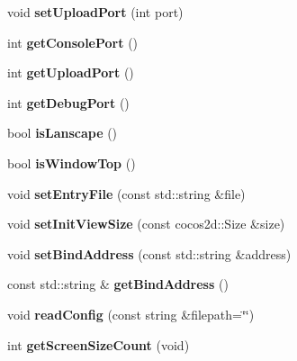 \begin{DoxyCompactItemize}
void {\bfseries set\+Upload\+Port} (int port)
\item 
\mbox{\label{classConfigParser_adcb7fe3088251c51044e757d50c95291}} 
int {\bfseries get\+Console\+Port} ()
\item 
\mbox{\label{classConfigParser_a2638e3b8d2fdb6d7476410021642dd13}} 
int {\bfseries get\+Upload\+Port} ()
\item 
\mbox{\label{classConfigParser_ad2927eaf355d08357c14be8bf7c62bb5}} 
int {\bfseries get\+Debug\+Port} ()
\item 
\mbox{\label{classConfigParser_a905a76a21f126ae443a590e72ad9c763}} 
bool {\bfseries is\+Lanscape} ()
\item 
\mbox{\label{classConfigParser_aa008f90e8fea9d8b047dd6f2c6baefa9}} 
bool {\bfseries is\+Window\+Top} ()
\item 
\mbox{\label{classConfigParser_a04dfb1d0e3b9c3aae4990f79521ba9d9}} 
void {\bfseries set\+Entry\+File} (const std\+::string \&file)
\item 
\mbox{\label{classConfigParser_af9d61c348ebb800c9b53249ebb36476e}} 
void {\bfseries set\+Init\+View\+Size} (const cocos2d\+::\+Size \&size)
\item 
\mbox{\label{classConfigParser_a5eeb400d4b72e1c0c61ed7c55b93180e}} 
void {\bfseries set\+Bind\+Address} (const std\+::string \&address)
\item 
\mbox{\label{classConfigParser_a82432f6f9f8373928d3bfc78d96a98b0}} 
const std\+::string \& {\bfseries get\+Bind\+Address} ()
\item 
\mbox{\label{classConfigParser_a8e039f9eb5e7d500972739c21741af6d}} 
void {\bfseries read\+Config} (const string \&filepath=\char`\"{}\char`\"{})
\item 
\mbox{\label{classConfigParser_aada01662f9c5d2dbc86200d2e0fea34e}} 
int {\bfseries get\+Screen\+Size\+Count} (void)
\item 

\end{DoxyCompactItemize}
